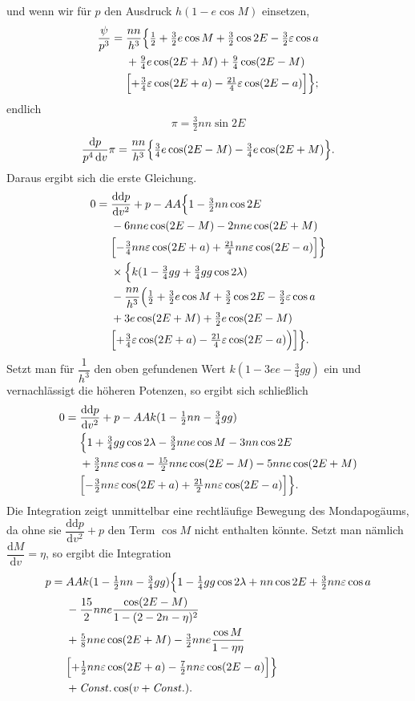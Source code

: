 \noindent und wenn wir für \(p\) den Ausdruck \(h(1-e\cos M)\) einsetzen,
\[
\begin{aligned}
\frac{\psi}{p^3}={}&\frac{nn}{h^3}\Bigl\{\tfrac12+\tfrac32e\cos M+\tfrac32\cos2E
-\tfrac32\varepsilon\cos a\\
&+\tfrac94e\cos(2E+M)+\tfrac94\cos(2E-M)\\
&\Bigl[+\tfrac34\varepsilon\cos(2E+a)-\tfrac{21}{4}\varepsilon\cos(2E-a)\Bigr]\Bigr\};
\end{aligned}
\]
\noindent endlich
\[
\pi=\tfrac32nn\sin2E
\]
\[
\frac{\mathrm{d}p}{p^4\,\mathrm{d}v}\pi
=\frac{nn}{h^3}\Bigl\{\tfrac34e\cos(2E-M)-\tfrac34e\cos(2E+M)\Bigr\}.
\]
\noindent Daraus ergibt sich die erste Gleichung.
\[
\begin{aligned}
0={}&\frac{\mathrm{dd}p}{\mathrm{d}v^2}+p-AA\Bigl\{1-\tfrac32nn\cos2E\\
&-6nne\cos(2E-M)-2nne\cos(2E+M)\\
&\Bigl[-\tfrac34nn\varepsilon\cos(2E+a)+\tfrac{21}{4}nn\varepsilon\cos(2E-a)\Bigr]\Bigr\}\\
&\times\Bigl\{k(1-\tfrac34gg+\tfrac34gg\cos2\lambda)\\
&-\frac{nn}{h^3}\Bigl(\tfrac12+\tfrac32e\cos M+\tfrac32\cos2E
-\tfrac32\varepsilon\cos a\\
&+3e\cos(2E+M)+\tfrac32e\cos(2E-M)\\
&\Bigl[+\tfrac34\varepsilon\cos(2E+a)-\tfrac{21}{4}\varepsilon\cos(2E-a)\Bigr)\Bigr]\Bigr\}.
\end{aligned}
\]
\noindent Setzt man für \(\dfrac1{h^3}\) den oben gefundenen Wert
\(k(1-3ee-\tfrac34gg)\) ein und vernachlässigt die höheren Potenzen, so ergibt sich schließlich
\[
\begin{aligned}
0={}&\frac{\mathrm{dd}p}{\mathrm{d}v^2}+p-AAk(1-\tfrac12nn-\tfrac34gg)\\
&\Bigl\{1+\tfrac34gg\cos2\lambda-\tfrac32nne\cos M-3nn\cos2E\\
&+\tfrac32nn\varepsilon\cos a-\tfrac{15}{2}nne\cos(2E-M)-5nne\cos(2E+M)\\
&\Bigl[-\tfrac32nn\varepsilon\cos(2E+a)+\tfrac{21}{2}nn\varepsilon\cos(2E-a)\Bigr]\Bigr\}.
\end{aligned}
\]
\noindent Die Integration zeigt unmittelbar eine rechtläufige Bewegung des
Mondapogäums, da ohne sie \(\dfrac{\mathrm{dd}p}{\mathrm{d}v^2}+p\)
den Term \(\cos M\) nicht enthalten könnte. Setzt man nämlich
\(\dfrac{\mathrm{d}M}{\mathrm{d}v}=\eta\), so ergibt die Integration
\[
\begin{aligned}
p={}&AAk(1-\tfrac12nn-\tfrac34gg)\Bigl\{1-\tfrac14gg\cos2\lambda
+nn\cos2E+\tfrac32nn\varepsilon\cos a\\
&-\frac{15}{2}nne\frac{\cos(2E-M)}{1-(2-2n-\eta)^2}\\
&+\tfrac58nne\cos(2E+M)-\tfrac32nne\frac{\cos M}{1-\eta\eta}\\
&\Bigl[+\tfrac12nn\varepsilon\cos(2E+a)-\tfrac72nn\varepsilon\cos(2E-a)\Bigr]\Bigr\}\\
&+\mathit{Const.}\cos(v+\mathit{Const.}).
\end{aligned}
\]
\clearpage
\endgroup
